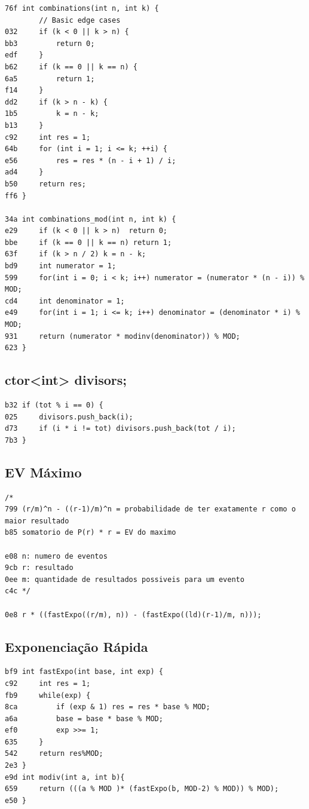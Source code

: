 \documentclass[11pt, a4paper, twoside]{article}
\begin{document}
{{\begin{lstlisting}
76f int combinations(int n, int k) {
        // Basic edge cases
032     if (k < 0 || k > n) {
bb3         return 0;
edf     }
b62     if (k == 0 || k == n) {
6a5         return 1;
f14     }
dd2     if (k > n - k) {
1b5         k = n - k;
b13     }
c92     int res = 1;
64b     for (int i = 1; i <= k; ++i) {
e56         res = res * (n - i + 1) / i;
ad4     }
b50     return res;
ff6 }

34a int combinations_mod(int n, int k) {
e29     if (k < 0 || k > n)  return 0;
bbe     if (k == 0 || k == n) return 1;
63f     if (k > n / 2) k = n - k;
bd9     int numerator = 1;
599     for(int i = 0; i < k; i++) numerator = (numerator * (n - i)) % MOD;
cd4     int denominator = 1;
e49     for(int i = 1; i <= k; i++) denominator = (denominator * i) % MOD;
931     return (numerator * modinv(denominator)) % MOD;
623 }
\end{lstlisting}

\subsection{ctor<int> divisors;}
\begin{lstlisting}
b32 if (tot % i == 0) {
025     divisors.push_back(i);
d73     if (i * i != tot) divisors.push_back(tot / i);
7b3 }
\end{lstlisting}

\subsection{EV Máximo}
\begin{lstlisting}
/*
799 (r/m)^n - ((r-1)/m)^n = probabilidade de ter exatamente r como o maior resultado 
b85 somatorio de P(r) * r = EV do maximo

e08 n: numero de eventos
9cb r: resultado
0ee m: quantidade de resultados possiveis para um evento
c4c */

0e8 r * ((fastExpo((r/m), n)) - (fastExpo((ld)(r-1)/m, n)));
\end{lstlisting}

\subsection{Exponenciação Rápida}
\begin{lstlisting}
bf9 int fastExpo(int base, int exp) {
c92     int res = 1;
fb9     while(exp) {
8ca         if (exp & 1) res = res * base % MOD;
a6a         base = base * base % MOD;
ef0         exp >>= 1;
635     }
542     return res%MOD;
2e3 }
e9d int modiv(int a, int b){
659     return (((a % MOD )* (fastExpo(b, MOD-2) % MOD)) % MOD);
e50 }


\end{lstlisting}}}
\end{document}
